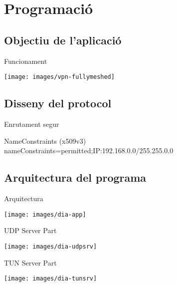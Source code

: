 \section{Programació}
\subsection{Objectiu de l'aplicació}
    \begin{frame}{Funcionament}
        \begin{center}
        \texttt{[image: images/vpn-fullymeshed]}
        \end{center}
    \end{frame}
\subsection{Disseny del protocol}
    \begin{frame}{Enrutament segur}
        \begin{block}{NameConstraints (x509v3)}
        nameConstraints=permitted;IP:192.168.0.0/255.255.0.0
        \end{block}
    \end{frame}
\subsection{Arquitectura del programa}
    \begin{frame}{Arquitectura}
        \begin{center}
        \texttt{[image: images/dia-app]}
        \end{center}
    \end{frame}
    \begin{frame}{UDP Server Part}
        \begin{center}
        \texttt{[image: images/dia-udpsrv]}
        \end{center}
    \end{frame}
    \begin{frame}{TUN Server Part}
        \begin{center}
        \texttt{[image: images/dia-tunsrv]}
        \end{center}
    \end{frame}

